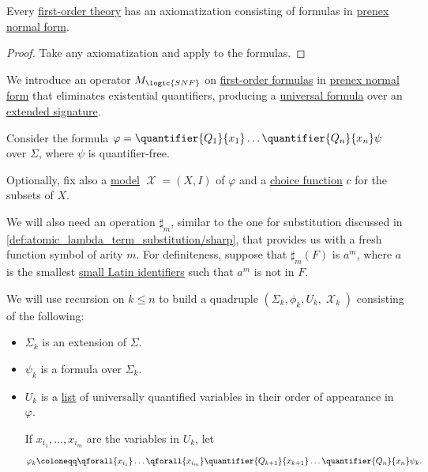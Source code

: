 \begin{proposition}\label{thm:fol_theory_pnf}
  Every \hyperref[def:fol_theory]{first-order theory} has an axiomatization consisting of formulas in \hyperref[def:fol_prenex_normal_form]{prenex normal form}.
\end{proposition}
\begin{proof}
  Take any axiomatization and apply  to the formulas.
\end{proof}

\begin{algorithm}[Skolemization]\label{alg:fol_skolemization}
  We introduce an operator \( M_{\logic{SNF}} \) on \hyperref[def:fol_formula]{first-order formulas} in \hyperref[def:fol_prenex_normal_form]{prenex normal form} that eliminates existential quantifiers, producing a \hyperref[def:fol_prenex_normal_form/universal]{universal formula} over an \hyperref[def:fol_signature_extension]{extended signature}.

  Consider the formula \( \varphi = \quantifier {Q_1} {x_1} \ldots \quantifier {Q_n} {x_n} \psi \) over \( \Sigma \), where \( \psi \) is quantifier-free.

  Optionally, fix also a \hyperref[def:fol_semantics/model]{model} \( \mscrX = (X, I) \) of \( \varphi \) and a \hyperref[def:choice_function]{choice function} \( c \) for the subsets of \( X \).

  We will also need an operation \( \sharp_m \), similar to the one for substitution discussed in \cref{def:atomic_lambda_term_substitution/sharp}, that provides us with a fresh function symbol of arity \( m \). For definiteness, suppose that \( \sharp_m(F) \) is \( a^m \), where \( a \) is the smallest \hyperref[def:variable_identifier]{small Latin identifiers} such that \( a^m \) is not in \( F \).

  We will use recursion on \( k \leq n \) to build a quadruple \( (\Sigma_k, \phi_k, U_k, \mscrX_k) \) consisting of the following:
  \begin{itemize}
    \item \( \Sigma_k \) is an extension of \( \Sigma \).
    \item \( \psi_k \) is a formula over \( \Sigma_k \).
    \item \( U_k \) is a \hyperref[def:ordered_tuple]{list} of universally quantified variables in their order of appearance in \( \varphi \).

    If \( x_{i_1}, \ldots, x_{i_m} \) are the variables in \( U_k \), let
    \begin{equation*}
      \varphi_k \coloneqq \qforall {x_{i_1}} \ldots \qforall {x_{i_m}} \quantifier {Q_{k+1}} {x_{k+1}} \ldots \quantifier{Q_n} {x_n} \psi_k.
    \end{equation*}


\end{itemize}
\end{algorithm}
